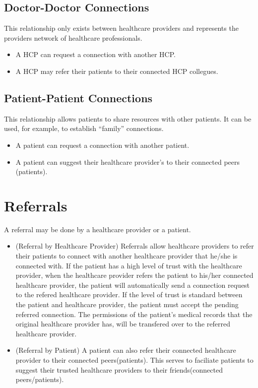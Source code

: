 \subsection{Doctor-Doctor Connections}
This relationship only exists between healthcare providers and represents the providers network of healthcare professionals.
\begin{itemize}
\item A HCP can request a connection with another HCP. 
\item A HCP may refer their patients to their connected HCP collegues. 
\end{itemize} 

\subsection{Patient-Patient Connections}
This relationship allows patients to share resources with other patients. It can be used, for example, to establish ``family'' connections.
\begin{itemize}
\item A patient can request a connection with another patient. 
\item A patient can suggest their healthcare provider's to their connected peers (patients).
\end{itemize} 

\section{Referrals}
A referral may be done by a healthcare provider or a patient.

\begin{itemize}
\item (Referral by Healthcare Provider) Referrals allow healthcare providers to refer their patients to connect with another healthcare provider that he/she is connected with. If the patient has a high level of trust with the healthcare provider, when the healthcare provider refers the patient to his/her connected healthcare provider, the patient will automatically send a connection request to the refered healthcare provider. If the level of trust is standard between the patient and healthcare provider, the patient must accept the pending referred connection. The permissions of the patient's medical records that the original healthcare provider has, will be transfered over to the referred healthcare provider. 
\item (Referral by Patient) A patient can also refer their connected healthcare provider to their connected peers(patients). This serves to faciliate patients to suggest their trusted healthcare providers to their friends(connected peers/patients).
\end{itemize} 

